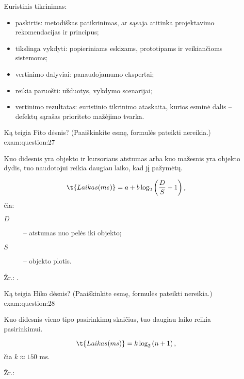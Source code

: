 \begin{question}
  Euristinis tikrinimas\cite{skaidres-11}:
  \begin{itemize}
    \item paskirtis: metodiškas patikrinimas, ar sąsaja atitinka
      projektavimo rekomendacijas ir principus;
    \item tikslinga vykdyti: popieriniams eskizams, prototipams ir
      veikiančioms sistemoms;
    \item vertinimo dalyviai: panaudojamumo ekspertai;
    \item reikia paruošti: užduotys, vykdymo scenarijai;
    \item vertinimo rezultatas: euristinio tikrinimo ataskaita, kurios
      esminė dalis – defektų sąrašas prioriteto mažėjimo tvarka.
  \end{itemize}
\end{question}

\begin{question}{%
  Ką teigia Fito dėsnis? (Paaiškinkite esmę, formulės pateikti nereikia.)
  }{exam:question:27}


  Kuo didesnis yra objekto ir kursoriaus atstumas arba kuo mažesnis
  yra objekto dydis, tuo naudotojui reikia daugiau laiko, kad jį
  pažymėtų.

  \begin{equation*}
    \t{Laikas (ms)} = a + b \log_2 \left( \frac{D}{S} + 1 \right),
  \end{equation*}
  čia:
  \begin{description}
    \item[$D$] – atstumas nuo pelės iki objekto;
    \item[$S$] – objekto plotis.
  \end{description}

  Žr.: \cite[48]{skaidres-8}.
\end{question}

\begin{question}{%
  Ką teigia Hiko dėsnis? (Paaiškinkite esmę, formulės pateikti nereikia.)
  }{exam:question:28}


  Kuo didesnis vieno tipo pasirinkimų skaičius, tuo daugiau laiko
  reikia pasirinkimui.

  \begin{equation*}
    \t{Laikas (ms)} = k \log_2 \left( n + 1 \right),
  \end{equation*}
  čia $k \approx 150$ ms.

  Žr.: \cite[51]{skaidres-8}
\end{question}

